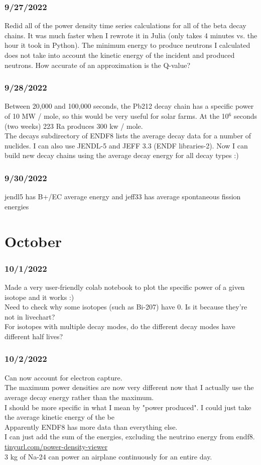 \documentclass[12pt]{article}
\begin{document}
\subsubsection{9/27/2022}
Redid all of the power density time series calculations for all of the beta decay chains. It was much faster when I rewrote it in Julia (only takes 4 minutes vs. the hour it took in Python). The minimum energy to produce neutrons I calculated does not take into account the kinetic energy of the incident and produced neutrons. How accurate of an approximation is the Q-value?
\subsubsection{9/28/2022}
Between 20,000 and 100,000 seconds, the Pb212 decay chain has a specific power of 10 MW / mole, so this would be very useful for solar farms. At the 10$^6$ seconds (two weeks) 223 Ra produces 300 kw / mole. \\
The decays subdirectory of ENDF8 lists the average decay data for a number of nuclides. I can also use JENDL-5 and JEFF 3.3 (ENDF libraries-2). Now I can build new decay chains using the average decay energy for all decay types :) 
\subsubsection{9/30/2022}
jendl5 has B+/EC average energy and jeff33 has average spontaneous fission energies
\section{October}
\subsubsection{10/1/2022}
Made a very user-friendly colab notebook to plot the specific power of a given isotope and it works :) \\
Need to check why some isotopes (such as Bi-207) have 0. Is it because they're not in livechart?\\
For isotopes with multiple decay modes, do the different decay modes have different half lives?
\subsubsection{10/2/2022}
Can now account for electron capture. \\
The maximum power densities are now very different now that I actually use the average decay energy rather than the maximum. \\
I should be more specific in what I mean by "power produced". I could just take the average kinetic energy of the be\\
Apparently ENDF8 has more data than everything else. \\
I can just add the sum of the energies, excluding the neutrino energy from endf8. \\
\href{tinyurl.com/power-density-viewer}{tinyurl.com/power-density-viewer}\\
3 kg of Na-24 can power an airplane continuously for an entire day. 
\end{document}
